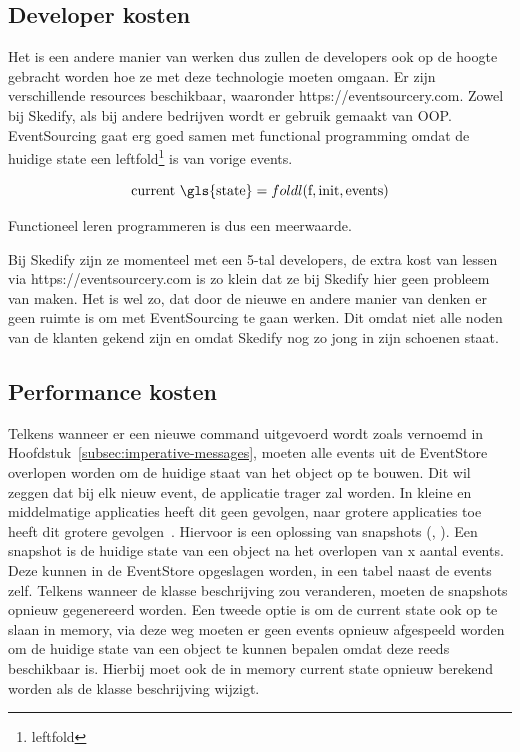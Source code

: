 \subsection{Developer kosten}
\label{subsec:developer-kosten}

Het is een andere manier van werken dus zullen de developers ook op de hoogte gebracht worden hoe ze met deze technologie moeten omgaan. Er zijn verschillende resources beschikbaar, waaronder https://eventsourcery.com. Zowel bij Skedify, als bij andere bedrijven wordt er gebruik gemaakt van \gls{OOP}. EventSourcing gaat erg goed samen met functional programming omdat de huidige \gls{state} een \gls{leftfold}\footnote{\glsdesc{leftfold}} is van vorige events.

\begin{equation}
\text{current \gls{state}} = foldl(\text{f}, \text{init}, \text{events})
\end{equation}

Functioneel leren programmeren is dus een meerwaarde.

Bij Skedify zijn ze momenteel met een 5-tal developers, de extra kost van lessen via https://eventsourcery.com is zo klein dat ze bij Skedify hier geen probleem van maken. Het is wel zo, dat door de nieuwe en andere manier van denken er geen ruimte is om met EventSourcing te gaan werken. Dit omdat niet alle noden van de klanten gekend zijn en omdat Skedify nog zo jong in zijn schoenen staat.

\subsection{Performance kosten}
\label{subsec:performance-kosten}

Telkens wanneer er een nieuwe command uitgevoerd wordt zoals vernoemd in Hoofdstuk~\ref{subsec:imperative-messages}, moeten alle events uit de EventStore overlopen worden om de huidige staat van het object op te bouwen. Dit wil zeggen dat bij elk nieuw event, de applicatie trager zal worden. In kleine en middelmatige applicaties heeft dit geen gevolgen, naar grotere applicaties toe heeft dit grotere gevolgen~\autocite{MicrosoftIntroducingES}. Hiervoor is een oplossing van snapshots (\textcite{Oliver2009Snapshots}, \textcite{chassaing2010event}). Een snapshot is de huidige \gls{state} van een object na het overlopen van x aantal events. Deze kunnen in de EventStore opgeslagen worden, in een tabel naast de events zelf. Telkens wanneer de klasse beschrijving zou veranderen, moeten de snapshots opnieuw gegenereerd worden. Een tweede optie is om de current \gls{state} ook op te slaan in memory, via deze weg moeten er geen events opnieuw afgespeeld worden om de huidige \gls{state} van een object te kunnen bepalen omdat deze reeds beschikbaar is. Hierbij moet ook de in memory current \gls{state} opnieuw berekend worden als de klasse beschrijving wijzigt.
